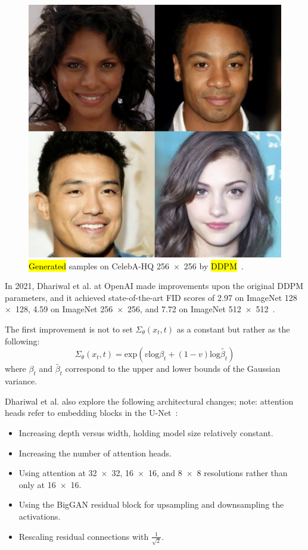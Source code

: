 \documentclass[technologies,article,accept,pdftex,moreauthors]{Definitions/mdpi}
\begin{document}
\begin{figure}[H]
    \includegraphics[width=.95\columnwidth]{celeb.png}
    \caption{\label{fig:DDPMCeleb}\hl{Generated} %
 samples on CelebA-HQ 256~$\times$~256 by \hl{DDPM}~\cite{ho2020denoising}.}
\end{figure}



In 2021, Dhariwal et al. at OpenAI made improvements upon the original DDPM parameters, and it achieved state-of-the-art FID scores of 2.97 on ImageNet 128~$\times$~128, 4.59 on ImageNet 256~$\times$~256, and 7.72 on ImageNet 512~$\times$~512~\cite{dhariwal2021diffusion}.

The first improvement is not to set $\Sigma_\theta(x_t, t) $ as a constant but rather as the following:
\begin{equation}
\Sigma_\theta(x_t, t) = \mathrm{exp}(v \mathrm{log} \beta_t + (1 - v) \mathrm{log} \tilde{\beta_t})
\end{equation}
where $\beta_t$ and  $\tilde{\beta_t}$ correspond to the upper and lower bounds of the Gaussian variance.


Dhariwal et al. also explore the following architectural changes; note: attention heads refer to embedding blocks in the U-Net~\cite{dhariwal2021diffusion}:
\begin{itemize}
\item Increasing depth versus width, holding model size relatively constant.
\item Increasing the number of attention heads.
\item Using attention at 32~$\times$~32, 16~$\times$~16, and 8~$\times$~8 resolutions rather than only at 16~$\times$~16.
\item Using the BigGAN residual block for upsampling and downsampling the activations.
\item Rescaling residual connections with $\frac{1}{\sqrt{2}}$.
\end{itemize}
\end{document}
